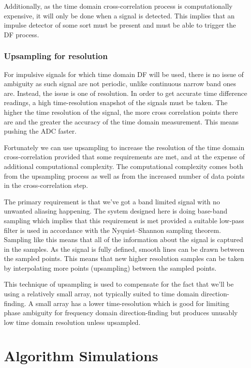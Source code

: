 Additionally, as the time domain cross-correlation process is computationally expensive, it will only be done when a signal is detected. This implies that an impulse detector of some sort must be present and must be able to trigger the DF process.

\subsubsection{Upsampling for resolution}
For impulsive signals for which time domain DF will be used, there is no issue of ambiguity as such signal are not periodic, unlike continuous narrow band ones are. Instead, the issue is one of resolution. In order to get accurate time difference readings, a high time-resolution snapshot of the signals must be taken. The higher the time resolution of the signal, the more cross correlation points there are and the greater the accuracy of the time domain measurement. This means pushing the ADC faster.

Fortunately we can use upsampling to increase the resolution of the time domain cross-correlation provided that some requirements are met, and at the expense of additional computational complexity. The computational complexity comes both from the upsampling process as well as from the increased number of data points in the cross-correlation step.

The primary requirement is that we've got a band limited signal with no unwanted aliasing happening. The system designed here is doing base-band sampling which implies that this requirement is met provided a suitable low-pass filter is used in accordance with the Nyquist–Shannon sampling theorem. Sampling like this means that all of the information about the signal is captured in the samples. As the signal is fully defined, smooth lines can be drawn between the sampled points. This means that new higher resolution samples can be taken by interpolating more points (upsampling) between the sampled points.

This technique of upsampling is used to compensate for the fact that we'll be using a relatively small array, not typically suited to time domain direction-finding. A small array has a lower time-resolution which is good for limiting phase ambiguity for frequency domain direction-finding but produces unusably low time domain resolution unless upsampled.

\section{Algorithm Simulations}
